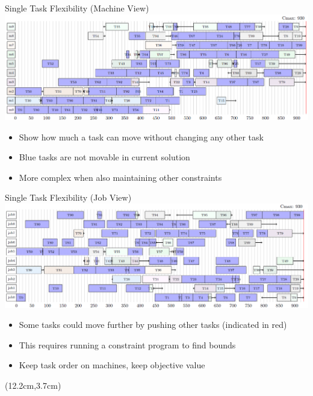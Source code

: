 \documentclass[dvipsnames,aspectratio=169]{beamer}
\begin{document}

\begin{frame}{Single Task Flexibility (Machine View)}
\includegraphics[width=14cm]{images/mt10machinefreedom}
\begin{itemize}
    \item Show how much a task can move without changing any other task
    \item Blue tasks are not movable in current solution
    \item More complex when also maintaining other constraints
\end{itemize}
\end{frame}

\begin{frame}{Single Task Flexibility (Job View)}
\includegraphics[width=14cm]{images/mt10jobfreedom}
\begin{itemize}
    \item Some tasks could move further by pushing other tasks (indicated in red)
    \item This requires running a constraint program to find bounds
    \item Keep task order on machines, keep objective value
\end{itemize}
\begin{textblock*}{2cm}(12.2cm,3.7cm)
\end{textblock*}
\end{frame}
\end{document}
